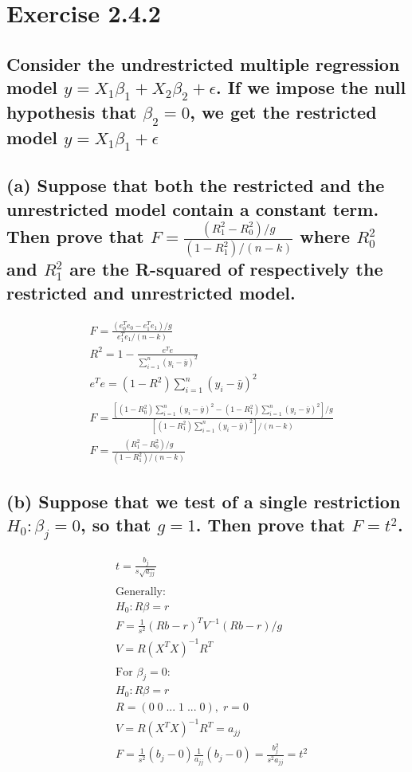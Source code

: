 \documentclass[12pt, a4paper]{article}
\begin{document}
\section*{Exercise 2.4.2}
\vspace{1em}

\subsection*{Consider the undrestricted multiple regression model $y = X_1\beta_1 + X_2\beta_2 + \epsilon $. If we impose the  null hypothesis that $\beta_2=0$, we get the restricted model $y = X_1\beta_1 + \epsilon$}
\vspace{1em}

\subsection*{(a) Suppose that both the restricted and the unrestricted model contain a constant term. Then prove that $F = \frac{(R_1^2 - R_0^2)/g}{(1-R^2_1)/(n-k)}$ where $R_0^2$ and $R_1^2$ are the R-squared of respectively the restricted and unrestricted model.}
\begin{align*}
    &F = \frac{(e_0^Te_0 - e_1^Te_1)/g}{e_1^Te_1/(n-k)}\\
    &R^2 = 1 -\frac{e^Te}{\sum_{i=1}^n(y_i - \bar{y})^2}\\
    &e^Te = (1 - R^2)\sum_{i=1}^n(y_i - \bar{y})^2\\\\
    &F = \frac{[(1 - R_0^2)\sum_{i=1}^n(y_i - \bar{y})^2 -  (1 - R_1^2)\sum_{i=1}^n(y_i - \bar{y})^2]/g}{[(1 - R_1^2)\sum_{i=1}^n(y_i - \bar{y})^2]/(n-k)}\\
    &F = \frac{(R_1^2 - R_0^2)/g}{(1-R^2_1)/(n-k)}
\end{align*}
\vspace{1em}

\subsection*{(b) Suppose that we test of a single restriction $H_0: \beta_j = 0$, so that $g=1$. Then prove that $F = t^2$.}
\begin{align*}
    &t = \frac{b_j}{s\sqrt{a_{jj}}}\\\\
    &\text{Generally:}\\
    &H_0: R\beta = r\\
    &F = \frac{1}{s^2}(Rb - r)^TV^{-1}(Rb - r)/g\\
    &V = R(X^TX)^{-1}R^T\\\\
    &\text{For }\beta_j = 0:\\
    &H_0: R\beta = r\\
    &R = (0\; 0\; ... \;1\; ... \;0), \; r = 0\\
    &V = R(X^TX)^{-1}R^T = a_{jj}\\
    &F = \frac{1}{s^2}(b_j - 0)\frac{1}{a_{jj}}(b_j - 0) = \frac{b_j^2}{s^2a_{jj}} = t^2
\end{align*}
\vspace{1em}
\end{document}
